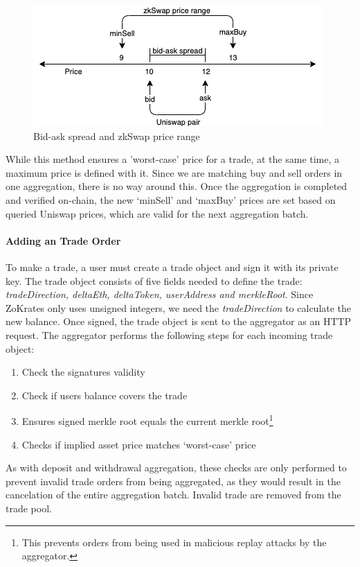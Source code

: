 \documentclass[../../thesis.tex]{subfiles}
\begin{document}
\begin{figure}[h]
    \centerline{\includegraphics[totalheight=3cm]{diagrams/priceing.png}}
    \caption{Bid-ask spread and zkSwap price range}
    \label{fig:price}
\end{figure}

While this method ensures a 'worst-case' price for a trade, at the same time, a maximum price is defined with it. Since we are matching buy and sell orders in one aggregation, there is no way around this. Once the aggregation is completed and verified on-chain, the new `minSell' and `maxBuy' prices are set based on queried Uniswap prices, which are valid for the next aggregation batch.

\paragraph{Adding an Trade Order}
To make a trade, a user must create a trade object and sign it with its private key. The trade object consists of five fields needed to define the trade: \textit{tradeDirection, deltaEth, deltaToken, userAddress and merkleRoot}. Since ZoKrates only uses unsigned integers, we need the \textit{tradeDirection} to calculate the new balance. Once signed, the trade object is sent to the aggregator as an HTTP request. The aggregator performs the following steps for each incoming trade object:
\begin{enumerate}
    \item Check the signatures validity
    \item Check if users balance covers the trade
    \item Ensures signed merkle root equals the current merkle root\footnote{This prevents orders from being used in malicious replay attacks by the aggregator.}
    \item Checks if implied asset price matches `worst-case' price
\end{enumerate}

As with deposit and withdrawal aggregation, these checks are only performed to prevent invalid trade orders from being aggregated, as they would result in the cancelation of the entire aggregation batch. Invalid trade are removed from the trade pool. 
\end{document}
